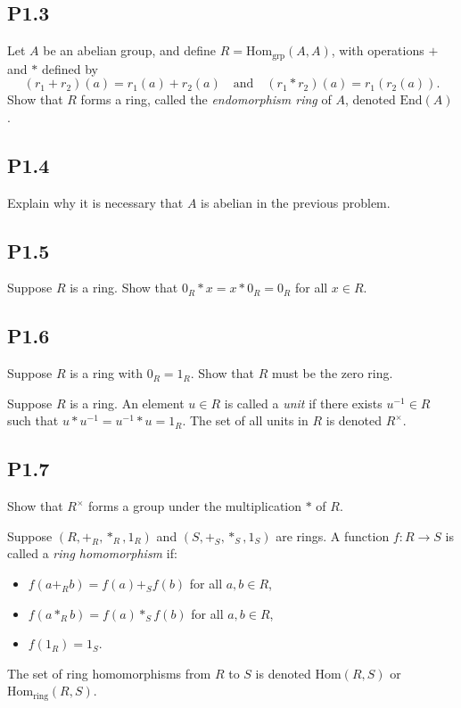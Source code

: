 \documentclass[lang=cn,11pt]{template}
\begin{document}
\subsection*{P1.3} Let \( A \) be an abelian group, and define \( R = \text{Hom}_{\text{grp}}(A, A) \), with operations \( + \) and \( * \) defined by
\[
(r_1 + r_2)(a) = r_1(a) + r_2(a) \quad \text{and} \quad (r_1 * r_2)(a) = r_1(r_2(a)).
\]
Show that \( R \) forms a ring, called the \textit{endomorphism ring} of \( A \), denoted \( \text{End}(A) \).

\subsection*{P1.4} Explain why it is necessary that \( A \) is abelian in the previous problem.

\subsection*{P1.5} Suppose \( R \) is a ring. Show that \( 0_R * x = x * 0_R = 0_R \) for all \( x \in R \).

\subsection*{P1.6} Suppose \( R \) is a ring with \( 0_R = 1_R \). Show that \( R \) must be the zero ring.

\begin{definition}
Suppose \( R \) is a ring. An element \( u \in R \) is called a \textit{unit} if there exists \( u^{-1} \in R \) such that \( u * u^{-1} = u^{-1} * u = 1_R \). The set of all units in \( R \) is denoted \( R^\times \).
\end{definition}

\subsection*{P1.7} Show that \( R^\times \) forms a group under the multiplication \( * \) of \( R \).

\begin{definition}
Suppose \( (R, +_R, *_R, 1_R) \) and \( (S, +_S, *_S, 1_S) \) are rings. A function \( f : R \to S \) is called a \textit{ring homomorphism} if:
\begin{itemize}
    \item \( f(a +_R b) = f(a) +_S f(b) \) for all \( a, b \in R \),
    \item \( f(a *_R b) = f(a) *_S f(b) \) for all \( a, b \in R \),
    \item \( f(1_R) = 1_S \).
\end{itemize}
The set of ring homomorphisms from \( R \) to \( S \) is denoted \( \text{Hom}(R, S) \) or \( \text{Hom}_{\text{ring}}(R, S) \).
\end{definition}
\end{document}
